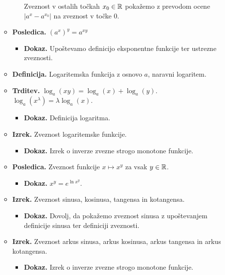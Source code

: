 \begin{enumerate}
\begin{itemize}
\begin{itemize}
            Zveznost v ostalih točkah $x_0 \in \mathbb{R}$ pokažemo z prevodom ocene $|a^x - a^{x_0}|$ na zveznost v točke $0$.
        \end{itemize}
        \item \colorbox{orange!30}{\textbf{Posledica.}} $(a^x)^y = a^{xy}$
        \begin{itemize}
            \item \colorbox{green!30}{\textbf{Dokaz.}} Upoštevamo definicijo eksponentne funkcije ter ustrezne zveznosti.
        \end{itemize}
        \item \colorbox{purple!30}{\textbf{Definicija.}} Logaritemska funkcija z osnovo $a$, naravni logaritem.
        \item \colorbox{blue!30}{\textbf{Trditev.}} $\log_a (xy) = \log_a (x) + \log_a (y)$. $\log_a (x^\lambda) = \lambda \log_a (x)$.
        \begin{itemize}
            \item \colorbox{green!30}{\textbf{Dokaz.}} Definicija logaritma.
        \end{itemize}
        \item \colorbox{blue!30}{\textbf{Izrek.}} Zveznost logaritemske funkcije.
        \begin{itemize}
            \item \colorbox{green!30}{\textbf{Dokaz.}} Izrek o inverze zvezne strogo monotone funkcije.
        \end{itemize}
        \item \colorbox{orange!30}{\textbf{Posledica.}} Zveznost funkcije $x \mapsto x^y$ za vsak $y \in \mathbb{R}$.
        \begin{itemize}
            \item \colorbox{green!30}{\textbf{Dokaz.}} $x^y = e^{\ln x^y}$.
        \end{itemize}
        \item \colorbox{blue!30}{\textbf{Izrek.}} Zveznost sinusa, kosinusa, tangensa in kotangensa.
        \begin{itemize}
            \item \colorbox{green!30}{\textbf{Dokaz.}} Dovolj, da pokažemo zveznost sinusa z upoštevanjem definicije sinusa ter definiciji zveznosti.
        \end{itemize}
        \item \colorbox{blue!30}{\textbf{Izrek.}} Zveznost arkus sinusa, arkus kosinusa, arkus tangensa in arkus kotangensa.
        \begin{itemize}
            \item \colorbox{green!30}{\textbf{Dokaz.}} Izrek o inverze zvezne strogo monotone funkcije.
        \end{itemize}
    \end{itemize}

\end{enumerate}